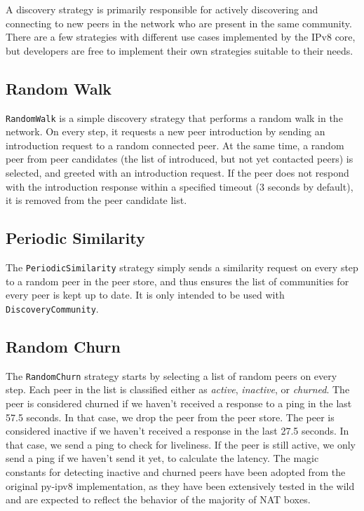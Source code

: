 A discovery strategy is primarily responsible for actively discovering and connecting to new peers in the network who are present in the same community. There are a few strategies with different use cases implemented by the IPv8 core, but developers are free to implement their own strategies suitable to their needs.

\subsection{Random Walk}

\texttt{RandomWalk} is a simple discovery strategy that performs a random walk in the network. On every step, it requests a new peer introduction by sending an introduction request to a random connected peer. At the same time, a random peer from peer candidates (the list of introduced, but not yet contacted peers) is selected, and greeted with an introduction request. If the peer does not respond with the introduction response within a specified timeout (3 seconds by default), it is removed from the peer candidate list.

\subsection{Periodic Similarity}

The \texttt{PeriodicSimilarity} strategy simply sends a similarity request on every step to a random peer in the peer store, and thus ensures the list of communities for every peer is kept up to date. It is only intended to be used with \texttt{DiscoveryCommunity}.

\subsection{Random Churn}

The \texttt{RandomChurn} strategy starts by selecting a list of random peers on every step. Each peer in the list is classified either as \textit{active}, \textit{inactive}, or \textit{churned}. The peer is considered churned if we haven't received a response to a ping in the last 57.5 seconds. In that case, we drop the peer from the peer store. The peer is considered inactive if we haven't received a response in the last 27.5 seconds. In that case, we send a ping to check for liveliness. If the peer is still active, we only send a ping if we haven't send it yet, to calculate the latency. The magic constants for detecting inactive and churned peers have been adopted from the original py-ipv8 implementation, as they have been extensively tested in the wild and are expected to reflect the behavior of the majority of NAT boxes. \cite{nat_wild}

